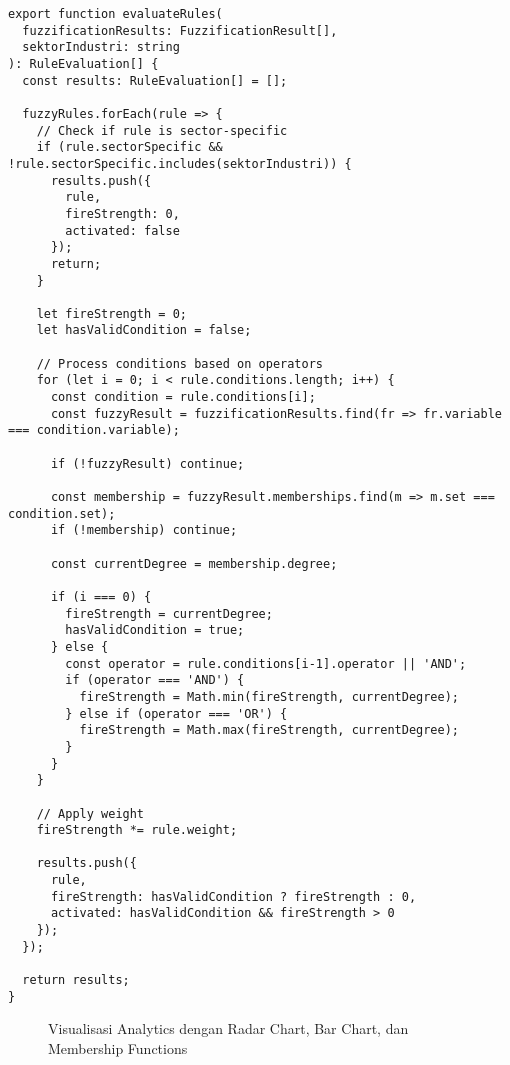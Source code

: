 \documentclass[12pt,a4paper]{article}
\begin{document}
\begin{verbatim}
export function evaluateRules(
  fuzzificationResults: FuzzificationResult[], 
  sektorIndustri: string
): RuleEvaluation[] {
  const results: RuleEvaluation[] = [];
  
  fuzzyRules.forEach(rule => {
    // Check if rule is sector-specific
    if (rule.sectorSpecific && !rule.sectorSpecific.includes(sektorIndustri)) {
      results.push({
        rule,
        fireStrength: 0,
        activated: false
      });
      return;
    }
    
    let fireStrength = 0;
    let hasValidCondition = false;
    
    // Process conditions based on operators
    for (let i = 0; i < rule.conditions.length; i++) {
      const condition = rule.conditions[i];
      const fuzzyResult = fuzzificationResults.find(fr => fr.variable === condition.variable);
      
      if (!fuzzyResult) continue;
      
      const membership = fuzzyResult.memberships.find(m => m.set === condition.set);
      if (!membership) continue;
      
      const currentDegree = membership.degree;
      
      if (i === 0) {
        fireStrength = currentDegree;
        hasValidCondition = true;
      } else {
        const operator = rule.conditions[i-1].operator || 'AND';
        if (operator === 'AND') {
          fireStrength = Math.min(fireStrength, currentDegree);
        } else if (operator === 'OR') {
          fireStrength = Math.max(fireStrength, currentDegree);
        }
      }
    }
    
    // Apply weight
    fireStrength *= rule.weight;
    
    results.push({
      rule,
      fireStrength: hasValidCondition ? fireStrength : 0,
      activated: hasValidCondition && fireStrength > 0
    });
  });
  
  return results;
}
\end{verbatim}

\begin{figure}[htbp] %
    \centering
    \caption{Visualisasi Analytics dengan Radar Chart, Bar Chart, dan Membership Functions}
    \label{fig:analytics}
\end{figure}
\end{document}
